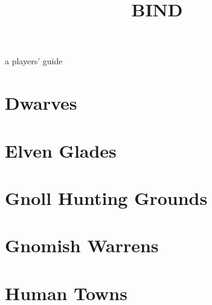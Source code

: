 \documentclass[a4paper,openany]{book}
\title{BIND}
\begin{document}

%
  {a players' guide}%

\glsunsetall



\clearpage

\begin{multicols}{2}

\end{multicols}

\printglossary[
  style=topicmcols,
  nonumberlist,
  ]

\printglossary[
  type=mech,
  style=topicmcols,
  nonumberlist,
  ]

\glsresetall

\mainmatter

\setcounter{track}{1}






\section[Dwarves]{Dwarves \Dw}

\begin{multicols}{2}
  
\end{multicols}

\section[Elves]{Elven Glades \El}
\begin{multicols}{2}
  
\end{multicols}

\section[Gnolls]{Gnoll Hunting Grounds \Nl}
\begin{multicols}{2}
  
\end{multicols}

\section[Gnomes]{Gnomish Warrens \Gn}
\begin{multicols}{2}
  
\end{multicols}

\section[Humans]{Human Towns \Hu}
\begin{multicols}{2}
  
\end{multicols}









\startappendix

\printindex

\cleardoublepage
\end{document}
